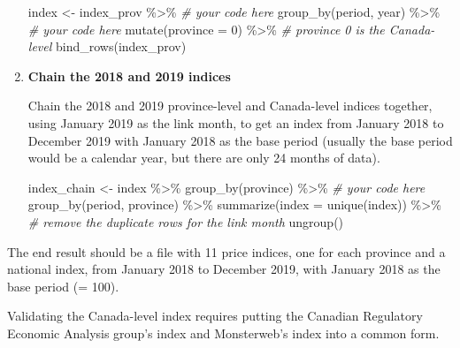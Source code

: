 \documentclass[
]{article}
\newenvironment{Shaded}{\begin{snugshade}}{\end{snugshade}}
\newcommand{\AttributeTok}[1]{\textcolor[rgb]{0.77,0.63,0.00}{#1}}
\newcommand{\CommentTok}[1]{\textcolor[rgb]{0.56,0.35,0.01}{\textit{#1}}}
\newcommand{\DecValTok}[1]{\textcolor[rgb]{0.00,0.00,0.81}{#1}}
\newcommand{\FunctionTok}[1]{\textcolor[rgb]{0.00,0.00,0.00}{#1}}
\newcommand{\NormalTok}[1]{#1}
\newcommand{\OtherTok}[1]{\textcolor[rgb]{0.56,0.35,0.01}{#1}}
\newcommand{\SpecialCharTok}[1]{\textcolor[rgb]{0.00,0.00,0.00}{#1}}
\begin{document}
\begin{enumerate}
\begin{Shaded}
\begin{Highlighting}[]
\NormalTok{index }\OtherTok{\textless{}{-}}\NormalTok{ index\_prov }\SpecialCharTok{\%\textgreater{}\%}
  \CommentTok{\# your code here}
  \FunctionTok{group\_by}\NormalTok{(period, year) }\SpecialCharTok{\%\textgreater{}\%}
  \CommentTok{\# your code here}
  \FunctionTok{mutate}\NormalTok{(}\AttributeTok{province =} \DecValTok{0}\NormalTok{) }\SpecialCharTok{\%\textgreater{}\%} \CommentTok{\# province 0 is the Canada{-}level}
  \FunctionTok{bind\_rows}\NormalTok{(index\_prov)}
\end{Highlighting}
\end{Shaded}
\item
  \textbf{Chain the 2018 and 2019 indices}

  Chain the 2018 and 2019 province-level and Canada-level indices together, using January 2019 as the link month, to get an index from January 2018 to December 2019 with January 2018 as the base period (usually the base period would be a calendar year, but there are only 24 months of data).

\begin{Shaded}
\begin{Highlighting}[]
\NormalTok{index\_chain }\OtherTok{\textless{}{-}}\NormalTok{ index }\SpecialCharTok{\%\textgreater{}\%}
  \FunctionTok{group\_by}\NormalTok{(province) }\SpecialCharTok{\%\textgreater{}\%}
  \CommentTok{\# your code here}
  \FunctionTok{group\_by}\NormalTok{(period, province) }\SpecialCharTok{\%\textgreater{}\%}
  \FunctionTok{summarize}\NormalTok{(}\AttributeTok{index =} \FunctionTok{unique}\NormalTok{(index)) }\SpecialCharTok{\%\textgreater{}\%} \CommentTok{\# remove the duplicate rows for the link month}
  \FunctionTok{ungroup}\NormalTok{()}
\end{Highlighting}
\end{Shaded}
\end{enumerate}

The end result should be a file with 11 price indices, one for each province and a national index, from January 2018 to December 2019, with January 2018 as the base period (= 100).

Validating the Canada-level index requires putting the Canadian Regulatory Economic Analysis group's index and Monsterweb's index into a common form.
\end{document}
